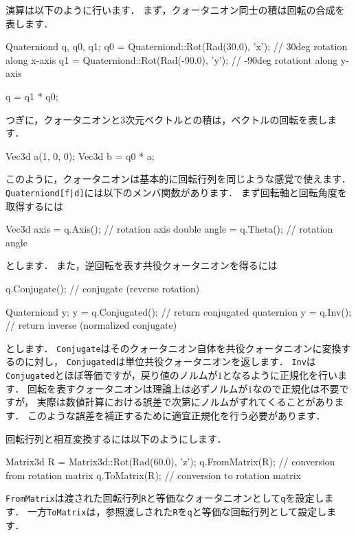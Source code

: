 \KLUDGE 演算は以下のように行います．
\KLUDGE まず，クォータニオン同士の積は回転の合成を表します．
\begin{sourcecode}
Quaterniond q, q0, q1;
q0 = Quaterniond::Rot(Rad(30.0), 'x');   // 30deg rotation along x-axis
q1 = Quaterniond::Rot(Rad(-90.0), 'y');  // -90deg rotationt along y-axis

q = q1 * q0;
\end{sourcecode}
\KLUDGE つぎに，クォータニオンと3\KLUDGE 次元ベクトルとの積は，ベクトルの回転を表します．
\begin{sourcecode}
Vec3d a(1, 0, 0);
Vec3d b = q0 * a;
\end{sourcecode}
\KLUDGE このように，クォータニオンは基本的に回転行列を同じような感覚で使えます．
\texttt{Quaterniond[f|d]}\KLUDGE には以下のメンバ関数があります．
\KLUDGE まず回転軸と回転角度を取得するには
\begin{sourcecode}
Vec3d axis = q.Axis();        // rotation axis
double angle = q.Theta();     // rotation angle
\end{sourcecode}
\KLUDGE とします．
\KLUDGE また，逆回転を表す共役クォータニオンを得るには
\begin{sourcecode}
q.Conjugate();         // conjugate (reverse rotation)

Quaterniond y;
y = q.Conjugated();    // return conjugated quaternion
y = q.Inv();           // return inverse (normalized conjugate)
\end{sourcecode}
\KLUDGE とします．
\texttt{Conjugate}\KLUDGE はそのクォータニオン自体を共役クォータニオンに変換するのに対し，
\texttt{Conjugated}\KLUDGE は単位共役クォータニオンを返します．
\texttt{Inv}\KLUDGE は\texttt{Conjugated}\KLUDGE とほぼ等価ですが，戻り値のノルムが$1$\KLUDGE となるように正規化を行います．
\KLUDGE 回転を表すクォータニオンは理論上は必ずノルムが$1$\KLUDGE なので正規化は不要ですが，
\KLUDGE 実際は数値計算における誤差で次第にノルムがずれてくることがあります．
\KLUDGE このような誤差を補正するために適宜正規化を行う必要があります．

\KLUDGE 回転行列と相互変換するには以下のようにします．
\begin{sourcecode}
Matrix3d R = Matrix3d::Rot(Rad(60.0), 'z');
q.FromMatrix(R);       // conversion from rotation matrix
q.ToMatrix(R);         // conversion to rotation matrix
\end{sourcecode}
\texttt{FromMatrix}\KLUDGE は渡された回転行列\texttt{R}\KLUDGE と等価なクォータニオンとして\texttt{q}\KLUDGE を設定します．
\KLUDGE 一方\texttt{ToMatrix}\KLUDGE は，参照渡しされた\texttt{R}\KLUDGE を\texttt{q}\KLUDGE と等価な回転行列として設定します．


